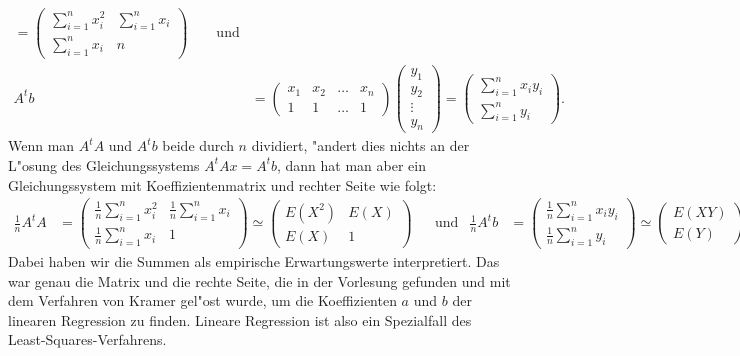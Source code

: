 \begin{loesung}
\[\begin{aligned}
=
\begin{pmatrix}
\displaystyle \sum_{i=1}^nx_i^2& \displaystyle \sum_{i=1}^nx_i\\
\displaystyle \sum_{i=1}^nx_i  & n
\end{pmatrix}
\qquad\text{und}
\\
A^tb
&=\begin{pmatrix}
x_1&x_2&\dots&x_n\\
  1&  1&\dots&1
\end{pmatrix}
\begin{pmatrix}
y_1\\
y_2\\
\vdots\\
y_n
\end{pmatrix}
=\begin{pmatrix}
\displaystyle \sum_{i=1}^n x_iy_i\\
\displaystyle \sum_{i=1}^n y_i
\end{pmatrix}.
\end{aligned}
\]
Wenn man $A^tA$ und $A^tb$ beide durch $n$ dividiert, "andert dies nichts an
der L"osung des Gleichungssystems $A^tAx=A^tb$, dann hat man aber ein
Gleichungssystem mit Koeffizientenmatrix und rechter Seite wie folgt:
\begin{align*}
\frac1nA^tA&=\begin{pmatrix}
\displaystyle \frac1n\sum_{i=1}^nx_i^2& \displaystyle \frac1n\sum_{i=1}^nx_i\\
\displaystyle \frac1n\sum_{i=1}^nx_i  & 1
\end{pmatrix}
\simeq
\begin{pmatrix}
E(X^2)&E(X)\\E(X)&1
\end{pmatrix}
&&\text{und}
&
\frac1nA^tb&=\begin{pmatrix}
\displaystyle \frac1n\sum_{i=1}^n x_iy_i\\
\displaystyle \frac1n\sum_{i=1}^n y_i
\end{pmatrix}
\simeq
\begin{pmatrix}
E(XY)\\E(Y)
\end{pmatrix}
\end{align*}
Dabei haben wir die Summen als empirische Erwartungswerte interpretiert.
Das war genau die Matrix und die rechte Seite, die in der Vorlesung gefunden
und mit dem Verfahren von Kramer gel"ost wurde, um die Koeffizienten $a$ und $b$
der linearen Regression zu finden.
Lineare Regression ist also ein Spezialfall des Least-Squares-Verfahrens.
\end{loesung}
